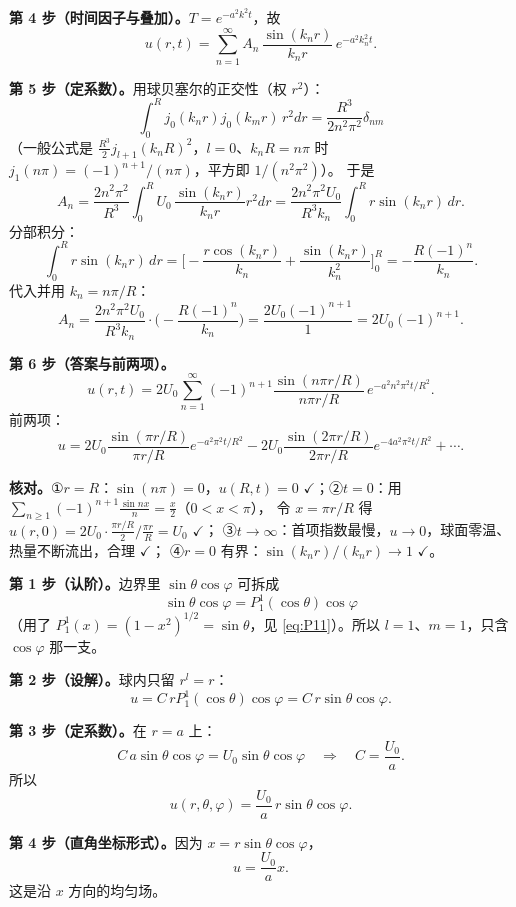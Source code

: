 \textbf{第 4 步（时间因子与叠加）。}$T=e^{-a^2k^2t}$，故
\[
u(r,t)=\sum_{n=1}^{\infty}A_n\,\frac{\sin(k_nr)}{k_nr}\,e^{-a^2k_n^2t}.
\]

\textbf{第 5 步（定系数）。}用球贝塞尔的正交性（权 $r^2$）：
\[
\int_0^Rj_0(k_nr)j_0(k_mr)\,r^2dr=\frac{R^3}{2n^2\pi^2}\delta_{nm}
\]
（一般公式是 $\frac{R^3}{2}j_{l+1}(k_nR)^2$，$l=0$、$k_nR=n\pi$ 时 $j_1(n\pi)=(-1)^{n+1}/(n\pi)$，平方即 $1/(n^2\pi^2)$）。
于是
\[
A_n=\frac{2n^2\pi^2}{R^3}\int_0^RU_0\,\frac{\sin(k_nr)}{k_nr}r^2dr
=\frac{2n^2\pi^2U_0}{R^3k_n}\int_0^Rr\sin(k_nr)\,dr .
\]
分部积分：
\[
\int_0^Rr\sin(k_nr)\,dr=\Big[-\frac{r\cos(k_nr)}{k_n}+\frac{\sin(k_nr)}{k_n^2}\Big]_0^R
=-\frac{R(-1)^n}{k_n}.
\]
代入并用 $k_n=n\pi/R$：
\[
A_n=\frac{2n^2\pi^2U_0}{R^3k_n}\cdot\Big(-\frac{R(-1)^n}{k_n}\Big)
=\frac{2U_0(-1)^{n+1}}{1}=2U_0(-1)^{n+1}.
\]

\textbf{第 6 步（答案与前两项）。}
\[
u(r,t)=2U_0\sum_{n=1}^{\infty}(-1)^{n+1}\frac{\sin(n\pi r/R)}{n\pi r/R}\,e^{-a^2n^2\pi^2t/R^2}.
\]
前两项：
\[
u=2U_0\frac{\sin(\pi r/R)}{\pi r/R}e^{-a^2\pi^2t/R^2}
-2U_0\frac{\sin(2\pi r/R)}{2\pi r/R}e^{-4a^2\pi^2t/R^2}+\cdots .
\]

\textbf{核对。}①$r=R$：$\sin(n\pi)=0$，$u(R,t)=0$ $\checkmark$；②$t=0$：用 $\sum_{n\ge1}(-1)^{n+1}\frac{\sin nx}{n}=\frac{x}{2}$（$0<x<\pi$），
令 $x=\pi r/R$ 得 $u(r,0)=2U_0\cdot\frac{\pi r/R}{2}\big/\frac{\pi r}{R}=U_0$ $\checkmark$；
③$t\to\infty$：首项指数最慢，$u\to0$，球面零温、热量不断流出，合理 $\checkmark$；
④$r=0$ 有界：$\sin(k_nr)/(k_nr)\to1$ $\checkmark$。


\textbf{第 1 步（认阶）。}边界里 $\sin\theta\cos\varphi$ 可拆成
\[
\sin\theta\cos\varphi=P_1^1(\cos\theta)\cos\varphi
\]
（用了 $P_1^1(x)=(1-x^2)^{1/2}=\sin\theta$，见 \eqref{eq:P11}）。所以 $l=1$、$m=1$，只含 $\cos\varphi$ 那一支。

\textbf{第 2 步（设解）。}球内只留 $r^l=r$：
\[
u=C\,rP_1^1(\cos\theta)\cos\varphi=C\,r\sin\theta\cos\varphi .
\]

\textbf{第 3 步（定系数）。}在 $r=a$ 上：
\[
C\,a\sin\theta\cos\varphi=U_0\sin\theta\cos\varphi
\quad\Longrightarrow\quad
C=\frac{U_0}{a}.
\]
所以
\[
u(r,\theta,\varphi)=\frac{U_0}{a}\,r\sin\theta\cos\varphi .
\]

\textbf{第 4 步（直角坐标形式）。}因为 $x=r\sin\theta\cos\varphi$，
\[
u=\frac{U_0}{a}x .
\]
这是沿 $x$ 方向的均匀场。

